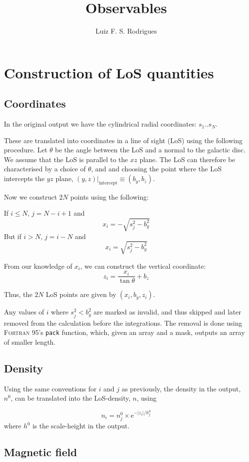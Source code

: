 \documentclass[a4paper,10pt]{article}
\title{Observables}
\author{Luiz F. S. Rodrigues}
\newcommand{\ee}{\mathrm{e}}  %
\begin{document}
\section{Construction of LoS quantities}
\subsection{Coordinates}

In the original output we have the cylindrical radial coordinates: $s_1 .. s_N$.

These are translated into coordinates in a line of sight (LoS) using the following
procedure.
Let $\theta$ be the angle between the LoS and a normal to the galactic disc.
We assume that the LoS is parallel to the $xz$ plane. The LoS can therefore be
characterised by a choice of $\theta$, and and choosing the point where the LoS
intercepts the $yz$ plane, $(y, z)|_\text{intercept} \equiv(b_y,b_z)$.


Now we construct $2N$ points using the following:

If $i\leq N$, $j = N-i+1$ and
\[
    x_{i} = -\sqrt{s_j^2 - b_y^2}
\]
But if $i>N$, $j = i-N$ and
\[
    x_{i} = \sqrt{s_j^2 - b_y^2}
\]



From our knowledge of $x_i$, we can construct the vertical coordinate:
\[
    z_i = \frac{x_i}{\tan\theta} + b_z
\]

Thus, the $2N$ LoS points are given by $(x_i,b_y, z_i)$.

Any values of $i$ where ${s_j^2}<b_y^2$ are marked as invalid, and thus skipped
and later removed from the calculation before the integrations.
The removal is done using \textsc{Fortran} 95's \texttt{pack}
function, which, given an array and a mask, outputs an array of smaller length.

\subsection{Density}

Using the same conventions for $i$ and $j$ as previously, the density in the output,
$n^0$, can be translated into the LoS-density, $n$, using

\[
    n_i = n^0_j \times\ee^{-|z_i|/h^0_j}
\]
where $h^0$ is the scale-height in the output.

\clearpage
\subsection{Magnetic field}
\end{document}

